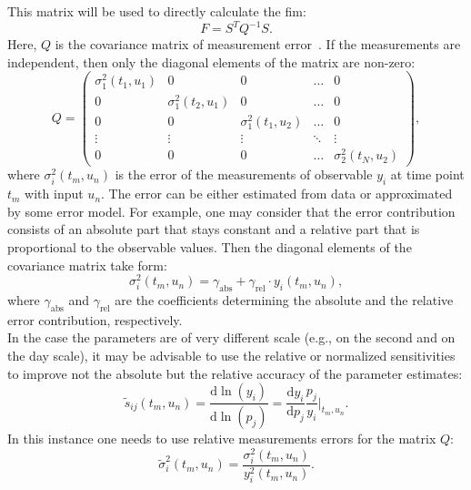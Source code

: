 \documentclass[graybox]{svmult}
\begin{document}
This matrix will be used to directly calculate the \ac{fim}:
\begin{equation}
    F = S^T Q^{-1} S.
\end{equation}
Here, $Q$ is the covariance matrix of measurement error~\cite{cintron-arias_sensitivity_2009, balsa-cantoComputationalProcedures2008}.
If the measurements are independent, then only the diagonal elements of the matrix are non-zero:
\begin{equation}
    Q =
\begin{pmatrix}
    \sigma_{1}^2(t_1, u_1) & 0                      & 0                      & \dots  & 0                     \\
    0                      & \sigma_{1}^2(t_2, u_1) & 0                      & \dots  & 0                     \\
    0                      & 0                      & \sigma_{1}^2(t_1, u_2) & \dots  & 0                     \\
    \vdots                 & \vdots                 & \vdots                 & \ddots & \vdots                \\
    0                      & 0                      & 0                      & \dots  & \sigma_{2}^2(t_N, u_2)
\end{pmatrix},
\label{eq:covar_matrix}
\end{equation}
where $\sigma_{i}^2 (t_m, u_n)$ is the error of the measurements of observable $y_i$ at time point $t_m$ with input $u_n$.
The error can be either estimated from data or approximated by some error model.
For example, one may consider that the error contribution consists of an absolute part that stays constant and a relative part that is proportional to the observable values.
Then the diagonal elements of the covariance matrix take form:
\begin{equation}
\label{eq:error_model}
    \sigma_{i}^2 (t_m, u_n) = \gamma_\text{abs} + \gamma_\text{rel} \cdot y_i(t_m, u_n),
\end{equation}
where $\gamma_\text{abs}$ and $\gamma_\text{rel}$ are the coefficients determining the absolute and the relative error contribution, respectively.
\\
In the case the parameters are of very different scale (e.g., on the second and on the day scale), it may be advisable to use the relative or normalized sensitivities to improve not the absolute but the relative accuracy of the parameter estimates:
\begin{equation}
    \tilde{s}_{ij} (t_m, u_n) =\frac{\mathrm{d}\ln(y_i)}{\mathrm{d}\ln(p_j)} = \frac{\mathrm{d} y_i}{\mathrm{d} p_j} \frac{p_j}{y_i}\bigg|_{t_m, u_n}.
\label{eq:relat_sensitivities}
\end{equation}
In this instance one needs to use relative measurements errors for the matrix $Q$:
\begin{equation}
    \tilde{\sigma}_{i}^2 (t_m, u_n) = \frac{\sigma_{i}^2 (t_m, u_n)}{y^2_i(t_m, u_n)}.
\end{equation}
%
\end{document}
